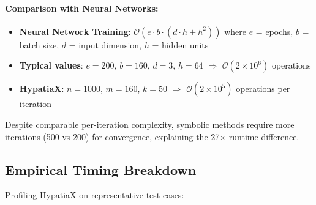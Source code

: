 \documentclass[twoside,11pt]{article}
\begin{document}
\paragraph{Comparison with Neural Networks:}
\begin{itemize}
\item \textbf{Neural Network Training}: $\mathcal{O}(e \cdot b \cdot (d \cdot h + h^2))$ where $e$ = epochs, $b$ = batch size, $d$ = input dimension, $h$ = hidden units
\item \textbf{Typical values}: $e=200$, $b=160$, $d=3$, $h=64$ $\Rightarrow$ $\mathcal{O}(2 \times 10^6)$ operations
\item \textbf{HypatiaX}: $n=1000$, $m=160$, $k=50$ $\Rightarrow$ $\mathcal{O}(2 \times 10^5)$ operations per iteration
\end{itemize}

Despite comparable per-iteration complexity, symbolic methods require more iterations (500 vs 200) for convergence, explaining the 27$\times$ runtime difference.

\subsection{Empirical Timing Breakdown}

Profiling HypatiaX on representative test cases:
\end{document}
